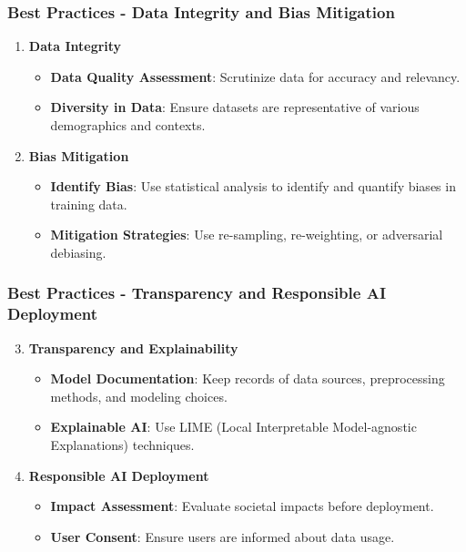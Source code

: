 \documentclass[aspectratio=169]{beamer}
\begin{document}
\begin{frame}[fragile]
    \frametitle{Best Practices - Data Integrity and Bias Mitigation}
    \begin{enumerate}
        \item \textbf{Data Integrity}
        \begin{itemize}
            \item \textbf{Data Quality Assessment}: Scrutinize data for accuracy and relevancy. 
            \item \textbf{Diversity in Data}: Ensure datasets are representative of various demographics and contexts.
        \end{itemize}

        \item \textbf{Bias Mitigation}
        \begin{itemize}
            \item \textbf{Identify Bias}: Use statistical analysis to identify and quantify biases in training data.
            \item \textbf{Mitigation Strategies}: Use re-sampling, re-weighting, or adversarial debiasing.
        \end{itemize}
    \end{enumerate}
\end{frame}

\begin{frame}[fragile]
    \frametitle{Best Practices - Transparency and Responsible AI Deployment}
    \begin{enumerate}
        \setcounter{enumii}{2}  %
        \item \textbf{Transparency and Explainability}
        \begin{itemize}
            \item \textbf{Model Documentation}: Keep records of data sources, preprocessing methods, and modeling choices.
            \item \textbf{Explainable AI}: Use LIME (Local Interpretable Model-agnostic Explanations) techniques.
        \end{itemize}
        
        \item \textbf{Responsible AI Deployment}
        \begin{itemize}
            \item \textbf{Impact Assessment}: Evaluate societal impacts before deployment.
            \item \textbf{User Consent}: Ensure users are informed about data usage.
        \end{itemize}
    \end{enumerate}
\end{frame}
\end{document}
